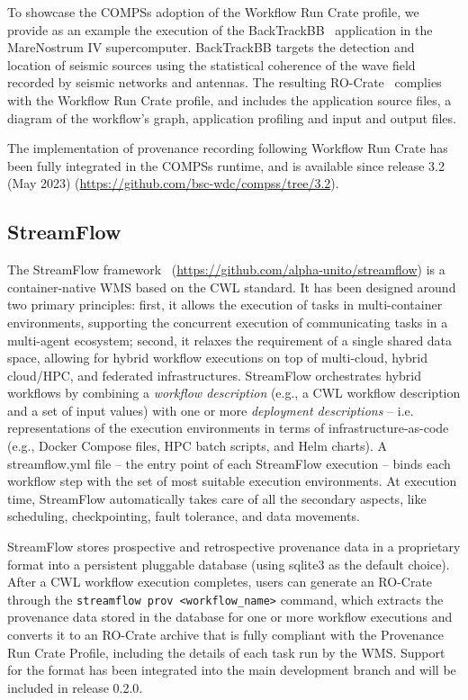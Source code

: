 \documentclass[10pt,letterpaper]{article}
\begin{document}
To showcase the COMPSs adoption of the Workflow Run Crate profile, we provide as an example the execution of the BackTrackBB~\cite{Poiata 2016}
application in the MareNostrum IV supercomputer.
BackTrackBB targets the detection and location of seismic sources using the statistical coherence of the wave field recorded by seismic networks and antennas.
The resulting RO-Crate~\cite{Poiata 2023} complies with the Workflow Run Crate profile, and includes the application source files, a diagram of the workflow's graph, application profiling and input and output files.

The implementation of provenance recording following Workflow Run Crate has been fully integrated in the COMPSs runtime, and is available since release 3.2 (May 2023) (\url{https://github.com/bsc-wdc/compss/tree/3.2}).


\subsection{StreamFlow}\label{streamflow}

The StreamFlow framework~\cite{Colonnelli 2020} (\url{https://github.com/alpha-unito/streamflow}) is a container-native WMS based on the CWL standard.
It has been designed around two primary principles: first, it allows the execution of tasks in multi-container environments, supporting the concurrent execution of communicating tasks in a multi-agent ecosystem; second, it relaxes the requirement of a single shared data space, allowing for hybrid workflow executions on top of multi-cloud, hybrid cloud/HPC, and federated infrastructures.
StreamFlow orchestrates hybrid workflows by combining a \emph{workflow description} (e.g., a CWL workflow description and a set of input values) with one or more \emph{deployment descriptions} -- i.e.
representations of the execution environments in terms of infrastructure-as-code (e.g., Docker Compose files, HPC batch scripts, and Helm charts).
A streamflow.yml file -- the entry point of each StreamFlow execution -- binds each workflow step with the set of most suitable execution environments.
At execution time, StreamFlow automatically takes care of all the secondary aspects, like scheduling, checkpointing, fault tolerance, and data movements.

StreamFlow stores prospective and retrospective provenance data in a proprietary format into a persistent pluggable database (using sqlite3 as the default choice).
After a CWL workflow execution completes, users can generate an RO-Crate through the \texttt{streamflow prov <workflow\_name>}
command, which extracts the provenance data stored in the database for one or more workflow executions and converts it to an RO-Crate archive that is fully compliant with the Provenance Run Crate Profile, including the details of each task run by the WMS.
Support for the format has been integrated into the main development branch and will be included in release 0.2.0.
\end{document}
